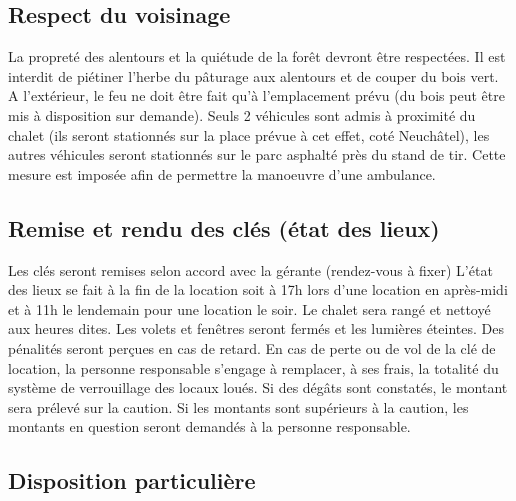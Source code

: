 \documentclass[a4paper,12pt]{extarticle}
\begin{document}
\subsection{Respect du voisinage}
La propreté des alentours et la quiétude de la forêt devront être respectées.
Il est interdit de piétiner l'herbe du pâturage aux alentours et de couper du bois vert.
A l'extérieur, le feu ne doit être fait qu'à l'emplacement prévu (du bois peut être mis à disposition sur demande).
Seuls 2 véhicules sont admis à proximité du chalet (ils seront stationnés sur la place prévue à cet effet, coté Neuchâtel), les autres véhicules seront stationnés sur le parc asphalté près du stand de tir. Cette mesure est imposée afin de permettre la manoeuvre d'une ambulance.

\subsection{Remise et rendu des clés (état des lieux)}
Les clés seront remises selon accord avec la gérante (rendez-vous à fixer)
{\color{red} L'état des lieux se fait à la fin de la location} soit à 17h lors d'une location en après-midi et à 11h le lendemain pour une location le soir.
Le chalet sera rangé et nettoyé aux heures dites. Les volets et fenêtres seront fermés et les lumières éteintes.
{\color{red} Des pénalités seront perçues en cas de retard.
En cas de perte ou de vol de la clé de location, la personne responsable s'engage à remplacer, à ses frais, la totalité du système de verrouillage des locaux loués.
Si des dégâts sont constatés, le montant sera prélevé sur la caution. Si les montants sont supérieurs à la caution, les montants en question seront demandés à la personne responsable.}


\subsection{Disposition particulière}
\end{document}
